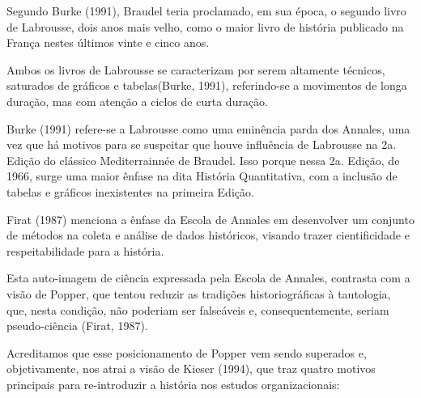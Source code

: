 \documentclass[
12pt,		%
openright,	%
twoside,  %
a4paper,			%
chapter=TITLE,		%
english,			%
french,				%
spanish,			%
brazil				%
]{USPSC-classe/USPSC}
\begin{document}
Segundo  Burke (1991), Braudel teria proclamado, em sua \'epoca, o segundo livro de Labrousse, dois anos mais velho, como \textquotedbl o maior livro de hist\'oria publicado na Fran\c{c}a nestes \'ultimos vinte e cinco anos\textquotedbl .




Ambos os livros de Labrousse se caracterizam por serem altamente t\'ecnicos, \textquotedbl saturados de gr\'aficos e tabelas\textquotedbl   (Burke, 1991), referindo-se a movimentos de longa dura\c{c}\~ao, mas com aten\c{c}\~ao a ciclos de curta dura\c{c}\~ao.




Burke (1991) refere-se a Labrousse como uma \textquotedbl emin\^encia parda dos Annales\textquotedbl , uma vez que \textquotedbl h\'a motivos para se suspeitar que houve influ\^encia de Labrousse na 2a. Edi\c{c}\~ao do cl\'assico Mediterrainn\'ee de Braudel\textquotedbl . Isso porque nessa 2a. Edi\c{c}\~ao, de 1966, surge uma maior \^enfase na dita Hist\'oria Quantitativa, com a inclus\~ao de tabelas e gr\'aficos inexistentes na primeira Edi\c{c}\~ao.




 Firat (1987) menciona a \^enfase da Escola de Annales em \textquotedbl desenvolver um conjunto de m\'etodos na coleta e an\'alise de dados hist\'oricos\textquotedbl , visando \textquotedbl trazer cientificidade e respeitabilidade para a hist\'oria\textquotedbl .




Esta auto-imagem de ci\^encia expressada pela Escola de Annales, contrasta com a vis\~ao de Popper, que tentou reduzir as tradi\c{c}\~oes historiogr\'aficas \`a tautologia, que, nesta condi\c{c}\~ao, n\~ao poderiam ser false\'aveis e, consequentemente, seriam pseudo-ci\^encia  (Firat, 1987).




Acreditamos que esse posicionamento de Popper vem sendo superados e, objetivamente, nos atrai a vis\~ao de  Kieser (1994), que traz quatro motivos principais para re-introduzir a hist\'oria nos estudos organizacionais:
\end{document}
